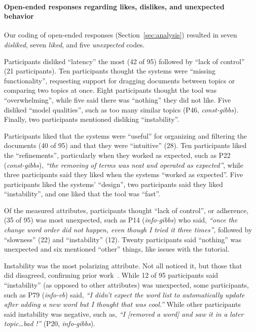 \paragraph{Open-ended responses regarding likes, dislikes, and unexpected behavior}

Our coding of open-ended responses (Section~\ref{sec:analysis}) resulted in seven \textit{disliked}, seven \textit{liked}, and five \textit{unexpected} codes.

Participants disliked ``latency'' the most (42 of 95) followed by ``lack of control'' (21 participants).
Ten participants thought the systems were ``missing functionality'', requesting support for dragging documents between topics or comparing two topics at once. Eight participants thought the tool was ``overwhelming'', while five said there was ``nothing'' they did not like. Five disliked ``model qualities'', such as too many similar topics (P46, \textit{const-gibbs}). Finally, two participants mentioned disliking ``instability''. 

Participants liked that the systems were ``useful'' for organizing and
filtering the documents (40 of 95) and that they were ``intuitive''
(28). Ten participants liked the ``refinements'', particularly when
they worked as expected, such as P22 (\textit{const-gibbs}),
\textit{``the removing of terms was neat and operated as expected''},
while three participants said they liked when the systems ``worked as
expected''. Five participants liked the systems' ``design'', two
participants said they liked ``instability'', and one liked that the
tool was ``fast''.

Of the measured attributes, participants thought ``lack of control'', or adherence, (35 of 95) was most unexpected, such as P14 (\textit{info-gibbs}) who said,\textit{ ``once the change word order did not happen, even though I tried it three times'',} followed by ``slowness'' (22) and ``instability'' (12).
Twenty participants said ``nothing'' was unexpected and six mentioned ``other'' things, like issues with the tutorial. 

Instability was the most
polarizing attribute.  Not all noticed it, but those that did disagreed, confirming
 prior work~\cite{Smith2018ClosingSystem}. While 12 of 95 participants said ``instability'' (as opposed to other attributes) was unexpected, some participants, such as P79 (\textit{info-vb}) said, \textit{``I didn't expect the word list to automatically update after adding a new word but I thought that was cool.''} While other participants said instability was negative, such as, \textit{``I [removed a word] and saw it in a later topic\dots bad !''} (P20, \textit{info-gibbs}). 
 
